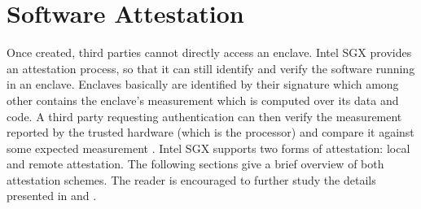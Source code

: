 \section{Software Attestation}
Once created, third parties cannot directly access an enclave. Intel SGX provides an attestation process, so that it can still identify and verify the software running in an enclave.
Enclaves basically are identified by their signature which among other contains the enclave's measurement which is computed over its data and code. A third party requesting
authentication can then verify the measurement reported by the trusted hardware (which is the processor) and compare it against some expected measurement \cite{Costan2016IntelSE}.
Intel SGX supports two forms of attestation: local and remote attestation. The following sections give a brief overview of both attestation schemes. The reader is encouraged to
further study the details presented in \cite{Costan2016IntelSE} and \cite{EnclaveWritersGuide}.

